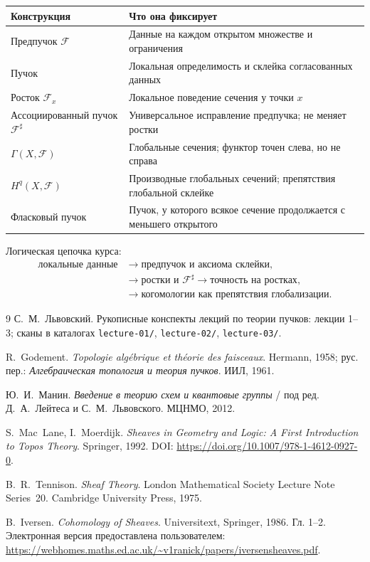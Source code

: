 \documentclass[11pt,b5paper,oneside]{article}
\newcommand{\F}{\mathscr F}
\theoremstyle{plain}
\theoremstyle{definition}
\theoremstyle{remark}
\begin{document}
\begin{center}
\renewcommand{\arraystretch}{1.25}
\begin{tabular}{@{}p{}p{}@{}}
\toprule
\textbf{Конструкция} & \textbf{Что она фиксирует} \\
\midrule
Предпучок $\F$ & Данные на каждом открытом множестве и ограничения \\
Пучок & Локальная определимость и склейка согласованных данных \\
Росток $\F_x$ & Локальное поведение сечения у точки $x$ \\
Ассоциированный пучок $\F^\sharp$ & Универсальное исправление предпучка; не меняет ростки \\
$\Gamma(X,\F)$ & Глобальные сечения; функтор точен слева, но не справа \\
$H^q(X,\F)$ & Производные глобальных сечений; препятствия глобальной склейке \\
Фласковый пучок & Пучок, у которого всякое сечение продолжается с меньшего открытого \\
\bottomrule
\end{tabular}
\end{center}

Логическая цепочка курса:
\[
\begin{aligned}
\text{локальные данные}
&\longrightarrow\text{предпучок и аксиома склейки},\\
&\longrightarrow\text{ростки и }\F^\sharp
\longrightarrow\text{точность на ростках},\\
&\longrightarrow\text{когомологии как препятствия глобализации}.
\end{aligned}
\]

\begin{thebibliography}{9}
С.~М.~Львовский. Рукописные конспекты лекций по теории пучков:
лекции 1--3; сканы в каталогах
\textenglish{\texttt{lecture-01/}, \texttt{lecture-02/},
\texttt{lecture-03/}}.

R.~Godement. \emph{Topologie algébrique et théorie des faisceaux}.
Hermann, 1958; рус. пер.: \emph{Алгебраическая топология и теория
пучков}. ИИЛ, 1961.

Ю.~И.~Манин. \emph{Введение в теорию схем и квантовые группы} /
под ред. Д.~А.~Лейтеса и С.~М.~Львовского. МЦНМО, 2012.

S.~Mac~Lane, I.~Moerdijk. \emph{Sheaves in Geometry and Logic:
A First Introduction to Topos Theory}. Springer, 1992.
DOI: \textenglish{\url{https://doi.org/10.1007/978-1-4612-0927-0}}.

B.~R.~Tennison. \emph{Sheaf Theory}. London Mathematical Society
Lecture Note Series~20. Cambridge University Press, 1975.

B.~Iversen. \emph{Cohomology of Sheaves}. Universitext, Springer,
1986. Гл. 1--2. Электронная версия предоставлена пользователем:
\textenglish{\url{https://webhomes.maths.ed.ac.uk/~v1ranick/papers/iversensheaves.pdf}}.
\end{thebibliography}
\end{document}
